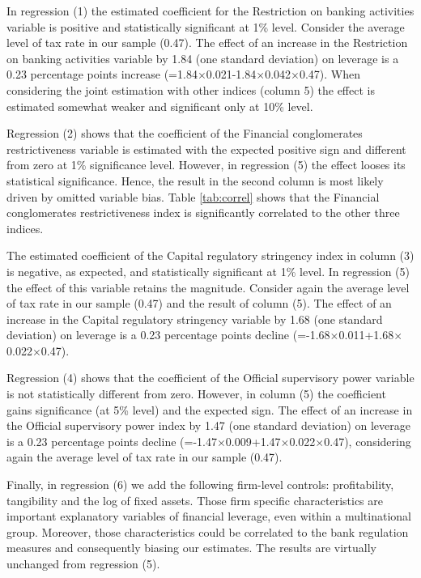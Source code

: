 \documentclass[12pt]{article}
\begin{document}
	  In regression (1) the estimated coefficient for the Restriction on banking activities variable is positive and statistically significant at 1\% level. Consider the average level of tax rate in our sample (0.47). The effect of an increase in the Restriction on banking activities variable by 1.84 (one standard deviation) on leverage is a 0.23 percentage points increase (=1.84$\times$0.021-1.84$\times$0.042$\times$0.47). When considering the joint estimation with other indices (column 5) the effect is estimated somewhat weaker and significant only at 10\% level. 
	  
	  Regression (2) shows that the coefficient of the Financial conglomerates restrictiveness variable is estimated with the expected positive sign and different from zero at 1\% significance level. However, in regression (5) the effect looses its statistical significance. Hence, the result in the second column is most likely driven by omitted variable bias. Table \ref{tab:correl} shows that the Financial conglomerates restrictiveness index is significantly correlated to the other three indices. 
	  
	  The estimated coefficient of the Capital regulatory stringency index in column (3) is negative, as expected, and statistically significant at 1\% level. In regression (5) the effect of this variable retains the magnitude. Consider again the average level of tax rate in our sample (0.47) and the result of column (5). The effect of an increase in the Capital regulatory stringency variable by 1.68 (one standard deviation) on leverage is a 0.23 percentage points decline (=-1.68$\times$0.011+1.68$\times$0.022$\times$0.47).
	  
	  Regression (4) shows that the coefficient of the Official supervisory power variable is not statistically different from zero. However, in column (5) the coefficient gains significance (at 5\% level) and the expected sign. The effect of an increase in the Official supervisory power index by 1.47 (one standard deviation) on leverage is a 0.23 percentage points decline (=-1.47$\times$0.009+1.47$\times$0.022$\times$0.47), considering again the average level of tax rate in our sample (0.47).
	  
	  Finally, in regression (6) we add the following firm-level controls: profitability, tangibility and the log of fixed assets. Those firm specific characteristics are important explanatory variables of financial leverage, even within a multinational group. Moreover, those characteristics could be correlated to the bank regulation measures and consequently biasing our estimates. The results are virtually unchanged from regression (5).     
	   	    			   		
\end{document}
